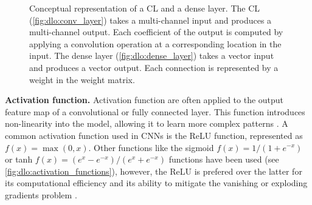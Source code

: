 \begin{figure}[htbp]
  \centering
  \caption{Conceptual representation of a \acl{CL} and a dense
    layer. The \acl{CL} (\cref{fig:dlo:conv_layer}) takes a
    multi-channel input and produces a multi-channel output. Each coefficient of
    the output is computed by applying a convolution operation at a
    corresponding location in the input. The dense layer
    (\cref{fig:dlo:dense_layer}) takes a vector input and produces a vector
    output. Each connection is represented by a weight in the weight matrix.}
  \label{fig:sota:layers}
\end{figure}

\noindent \textbf{Activation function.} Activation function are often applied to
the output feature map of a convolutional or fully connected layer. This
function introduces non-linearity into the model, allowing it to learn more
complex patterns \cite{long2015fully}. A common activation function used in
\acp{CNN} is the \ac{ReLU} function, represented as $f(x)=\max(0,x)$. Other
functions like the sigmoid $f(x)=1/(1+e^{-x})$ or tanh $f(x)=(e^{x}
-e^{-x})/(e^{x}+e^{-x})$ functions have been used (see
\cref{fig:dlo:activation_functions}), however, the \ac{ReLU} is prefered over
the latter for its computational efficiency and its ability to mitigate the
vanishing or exploding gradients problem
\cite{hochreiter2001gradient,glorot2010understanding}.\\

